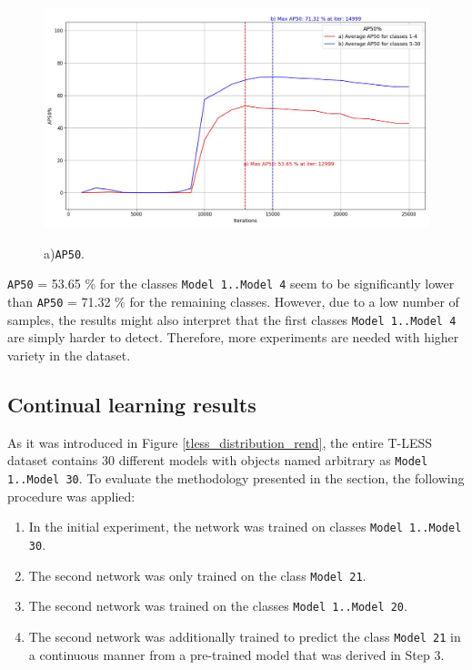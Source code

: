 \begin{figure}[htb]
	\begin{center}
	\includegraphics[width=14cm]{./AP50_per_class_group.jpg}
	\end{center}
	\caption{a)\texttt{AP50}.}
	\begin{center}
	\label{myModel_withOrigSched_grouped}
	\end{center}
\end{figure}
\FloatBarrier 

\texttt{AP50} = 53.65 \% for the classes \texttt{Model 1..Model 4} seem to be significantly lower than \texttt{AP50} = 71.32 \% for the remaining classes. However, due to a low number of samples, the results might also interpret that the first classes \texttt{Model 1..Model 4} are simply harder to detect. Therefore, more experiments are needed with higher variety in the dataset.  


\subsection{Continual learning results}
\label{cont_learning_results} 
As it was introduced in Figure \ref{tless_distribution_rend}, the entire T-LESS dataset contains 30 different models with objects named arbitrary as \texttt{Model 1..Model 30}. To evaluate the methodology presented in the  section, the following procedure was applied:
 
\begin{enumerate}
\item In the initial experiment, the network was trained on classes \texttt{Model 1..Model 30}.
\item The second network was only trained on the class \texttt{Model 21}.
\item The second network was trained on the classes \texttt{Model 1..Model 20}.
\item The second network was additionally trained to predict the class \texttt{Model 21} in a continuous manner from a pre-trained model that was derived in Step 3.
\end{enumerate} 

